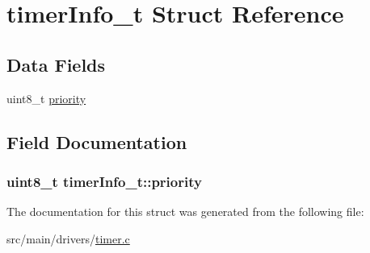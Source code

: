 \hypertarget{structtimerInfo__t}{\section{timer\+Info\+\_\+t Struct Reference}
\label{structtimerInfo__t}
}
\subsection*{Data Fields}
\begin{DoxyCompactItemize}
\item 
uint8\+\_\+t \hyperlink{structtimerInfo__t_a5710e8667e14860abaf52e1306ab001a}{priority}
\end{DoxyCompactItemize}


\subsection{Field Documentation}
\hypertarget{structtimerInfo__t_a5710e8667e14860abaf52e1306ab001a}{
\subsubsection[{priority}]{\setlength{\rightskip}{0pt plus 5cm}uint8\+\_\+t timer\+Info\+\_\+t\+::priority}}\label{structtimerInfo__t_a5710e8667e14860abaf52e1306ab001a}


The documentation for this struct was generated from the following file\+:\begin{DoxyCompactItemize}
\item 
src/main/drivers/\hyperlink{timer_8c}{timer.\+c}\end{DoxyCompactItemize}
